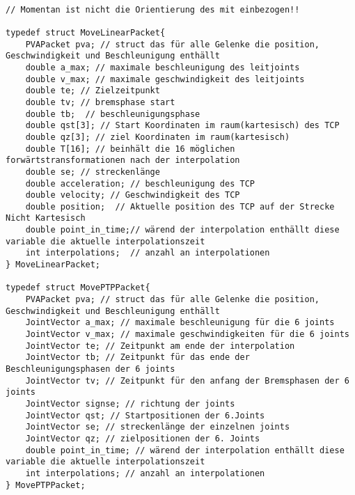 \documentclass[
a4paper,
12pt,
oneside,
headsepline,		%
footsepline,		%
]{scrbook}
\begin{document}
\begin{lstlisting}

// Momentan ist nicht die Orientierung des mit einbezogen!!

typedef struct MoveLinearPacket{
    PVAPacket pva; // struct das für alle Gelenke die position, Geschwindigkeit und Beschleunigung enthällt
    double a_max; // maximale beschleunigung des leitjoints
    double v_max; // maximale geschwindigkeit des leitjoints 
    double te; // Zielzeitpunkt
    double tv; // bremsphase start
    double tb;  // beschleunigungsphase
    double qst[3]; // Start Koordinaten im raum(kartesisch) des TCP 
    double qz[3]; // ziel Koordinaten im raum(kartesisch)
    double T[16]; // beinhält die 16 möglichen forwärtstransformationen nach der interpolation
    double se; // streckenlänge
    double acceleration; // beschleunigung des TCP
    double velocity; // Geschwindigkeit des TCP
    double position;  // Aktuelle position des TCP auf der Strecke Nicht Kartesisch
    double point_in_time;// wärend der interpolation enthällt diese variable die aktuelle interpolationszeit
    int interpolations;  // anzahl an interpolationen
} MoveLinearPacket;

typedef struct MovePTPPacket{
    PVAPacket pva; // struct das für alle Gelenke die position, Geschwindigkeit und Beschleunigung enthällt
    JointVector a_max; // maximale beschleunigung für die 6 joints
    JointVector v_max; // maximale geschwindigkeiten für die 6 joints
    JointVector te; // Zeitpunkt am ende der interpolation
    JointVector tb; // Zeitpunkt für das ende der Beschleunigungsphasen der 6 joints
    JointVector tv; // Zeitpunkt für den anfang der Bremsphasen der 6 joints
    JointVector signse; // richtung der joints
    JointVector qst; // Startpositionen der 6.Joints
    JointVector se; // streckenlänge der einzelnen joints
    JointVector qz; // zielpositionen der 6. Joints
    double point_in_time; // wärend der interpolation enthällt diese variable die aktuelle interpolationszeit
    int interpolations; // anzahl an interpolationen
} MovePTPPacket;
\end{lstlisting}
\end{document}
